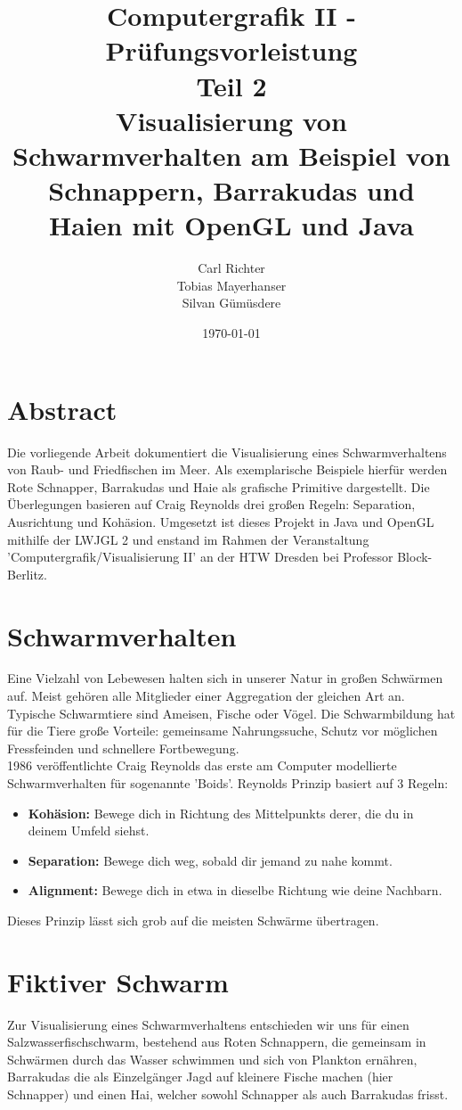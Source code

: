 \documentclass[11pt]{article}
\title{\textbf{Computergrafik II - Prüfungsvorleistung}\\Teil 2\\Visualisierung von Schwarmverhalten am Beispiel von Schnappern, Barrakudas und Haien mit OpenGL und Java}
\date{\today}
\author{Carl Richter\\
		Tobias Mayerhanser\\
		Silvan Gümüsdere}
\begin{document}
\maketitle
\newpage
\tableofcontents
\newpage
\section{Abstract}
Die vorliegende Arbeit dokumentiert die Visualisierung eines Schwarmverhaltens von Raub- und Friedfischen im Meer. Als exemplarische Beispiele hierfür werden Rote Schnapper, Barrakudas und Haie als grafische Primitive dargestellt. Die Überlegungen basieren auf Craig Reynolds drei großen Regeln: Separation, Ausrichtung und Kohäsion. Umgesetzt ist dieses Projekt in Java und OpenGL mithilfe der LWJGL 2 und enstand im Rahmen der Veranstaltung 'Computergrafik/Visualisierung II' an der HTW Dresden bei Professor Block-Berlitz.
\section{Schwarmverhalten}
Eine Vielzahl von Lebewesen halten sich in unserer Natur in großen Schwärmen auf. Meist gehören alle Mitglieder einer Aggregation der gleichen Art an. Typische Schwarmtiere sind Ameisen, Fische oder Vögel. Die Schwarmbildung hat für die Tiere große Vorteile: gemeinsame Nahrungssuche, Schutz vor möglichen Fressfeinden und schnellere Fortbewegung.\\
1986 veröffentlichte Craig Reynolds das erste am Computer modellierte Schwarmverhalten für sogenannte 'Boids'. Reynolds Prinzip basiert auf 3 Regeln:
\begin{itemize}
	\item \textbf{Kohäsion:} Bewege dich in Richtung des Mittelpunkts derer, die du in deinem Umfeld siehst.
	\item \textbf{Separation:} Bewege dich weg, sobald dir jemand zu nahe kommt.
	\item \textbf{Alignment:} Bewege dich in etwa in dieselbe Richtung wie deine Nachbarn.
\end{itemize}
Dieses Prinzip lässt sich grob auf die meisten Schwärme übertragen.
\section{Fiktiver Schwarm}
Zur Visualisierung eines Schwarmverhaltens entschieden wir uns für einen Salzwasserfischschwarm, bestehend aus Roten Schnappern, die gemeinsam in Schwärmen durch das Wasser schwimmen und sich von Plankton ernähren, Barrakudas die als Einzelgänger Jagd auf kleinere Fische machen (hier Schnapper) und einen Hai, welcher sowohl Schnapper als auch Barrakudas frisst.
\end{document}
